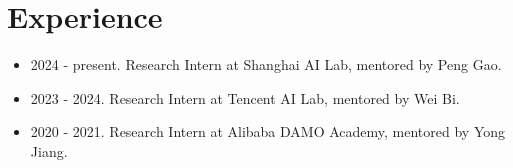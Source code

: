 \documentclass[a4paper,12pt]{article}
\begin{document}
\section{Experience}
\begin{itemize}[leftmargin=18pt]
      \item 2024 - present. Research Intern at Shanghai AI Lab, mentored by Peng Gao.
      \item 2023 - 2024. Research Intern at Tencent AI Lab, mentored by Wei Bi.
      \item 2020 - 2021. Research Intern at Alibaba DAMO Academy, mentored by Yong Jiang.
\end{itemize}
\end{document}
